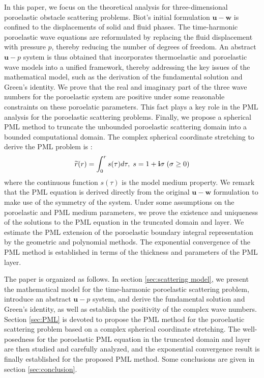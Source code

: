 \documentclass[11pt]{article}
\newcommand{\sig}{\sigma}
\newcommand{\wid}{\widetilde}
\begin{document}
In this paper, we focus on the theoretical analysis for three-dimensional poroelastic obstacle scattering problems. 
Biot's initial formulation $\mathbf{u}-\mathbf{w}$ is confined to the displacements of solid and fluid phases. 
The time-harmonic poroelastic wave equations are reformulated by replacing the fluid displacement with pressure $p$, 
thereby reducing the number of degrees of freedom. An abstract $\mathbf{u}-p$ system is thus obtained that incorporates 
thermoelastic and poroelastic wave models into a unified framework, thereby addressing the key issues of the mathematical model,
such as the derivation of the fundamental solution and Green's identity. We prove that the real and imaginary part of the three
wave numbers for the poroelastic system are positive under some reasonable constraints on these poroelatic parameters. This fact
plays a key role in the PML analysis for the poroelastic scattering problems. Finally, we propose a spherical PML method to truncate
the unbounded poroelastic scattering domain into a bounded computational domain. The complex spherical coordinate stretching to
derive the PML problem is \cite{Chew1997}:
\begin{equation*}
\wid{r}(r)=\int_0^{r} s(\tau)d\tau, \; s=1+{\bf i}\sig\;(\sigma\geq 0)
\end{equation*}
where the continuous function $s(\tau)$ is the model medium property. We remark that the PML equation is derived directly from
the original $\mathbf{u}-\mathbf{w}$ formulation to make use of the symmetry of the system. Under some assumptions on the 
poroelastic and PML medium parameters, we prove the existence and uniqueness of the solutions to the PML equation in the truncated 
domain and layer.  We estimate the PML extension of the poroelastic boundary integral representation by the geometric and polynomial
methods. The exponential convergence of the PML method is established in terms of the thickness and parameters of the PML layer.


The paper is organized as follows. In section \ref{sec:scattering model}, we present the mathematical model for the time‑harmonic poroelastic scattering problem, introduce an abstract $\mathbf{u}-p$ system, and derive the fundamental solution and Green’s identity, as well as establish the positivity of the complex wave numbers. Section \ref{sec:PML} is devoted to propose the PML method for the poroelastic scattering problem based on a complex spherical coordinate stretching.  The well-posedness for the poroelastic PML equation in the truncated domain 
and layer are then studied and carefully analyzed, and the exponential convergence result
is finally established for the proposed PML method. Some conclusions are given in section \ref{sec:conclusion}.
\end{document}
